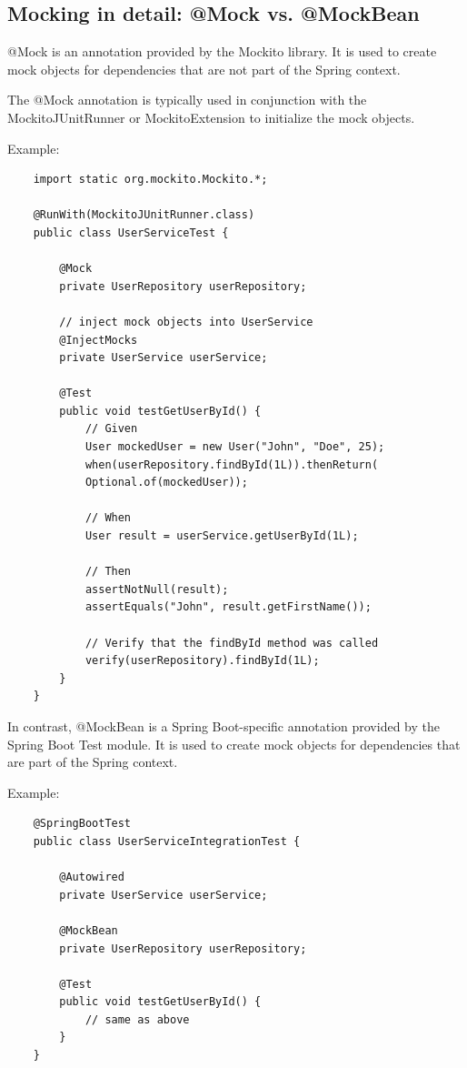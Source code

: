 \documentclass{scrartcl}
\begin{document}
\subsection{Mocking in detail: @Mock vs. @MockBean}

@Mock is an annotation provided by the Mockito library. It is used to create mock objects for dependencies that are not part of the Spring context.

The @Mock annotation is typically used in conjunction with the MockitoJUnitRunner or MockitoExtension to initialize the mock objects.

Example:

\begin{lstlisting}
    import static org.mockito.Mockito.*;

    @RunWith(MockitoJUnitRunner.class)
    public class UserServiceTest {

        @Mock
        private UserRepository userRepository;

        // inject mock objects into UserService
        @InjectMocks
        private UserService userService;

        @Test
        public void testGetUserById() {
            // Given
            User mockedUser = new User("John", "Doe", 25);
            when(userRepository.findById(1L)).thenReturn(
            Optional.of(mockedUser));

            // When
            User result = userService.getUserById(1L);

            // Then
            assertNotNull(result);
            assertEquals("John", result.getFirstName());

            // Verify that the findById method was called
            verify(userRepository).findById(1L);
        }
    }
\end{lstlisting}

In contrast, @MockBean is a Spring Boot-specific annotation provided by the Spring Boot Test module. It is used to create mock objects for dependencies that are part of the Spring context.

Example:

\begin{lstlisting}
    @SpringBootTest
    public class UserServiceIntegrationTest {

        @Autowired
        private UserService userService;

        @MockBean
        private UserRepository userRepository;

        @Test
        public void testGetUserById() {
            // same as above
        }
    }
\end{lstlisting}
\end{document}
